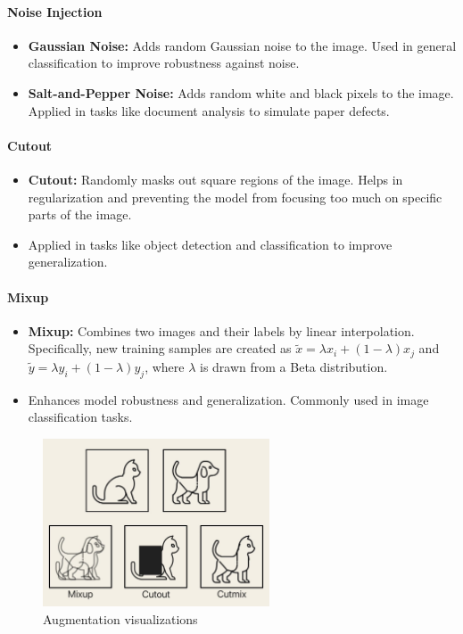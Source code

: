 \documentclass[12pt]{article}
\begin{document}
\paragraph{Noise Injection}
\begin{itemize}
    \item \textbf{Gaussian Noise:} Adds random Gaussian noise to the image. Used in general classification to improve robustness against noise.
    \item \textbf{Salt-and-Pepper Noise:} Adds random white and black pixels to the image. Applied in tasks like document analysis to simulate paper defects.
\end{itemize}

\paragraph{Cutout}
\begin{itemize}
    \item \textbf{Cutout:} Randomly masks out square regions of the image. Helps in regularization and preventing the model from focusing too much on specific parts of the image.
    \item Applied in tasks like object detection and classification to improve generalization.
\end{itemize}

\paragraph{Mixup}
\begin{itemize}
    \item \textbf{Mixup:} Combines two images and their labels by linear interpolation. Specifically, new training samples are created as \( \tilde{x} = \lambda x_i + (1 - \lambda) x_j \) and \( \tilde{y} = \lambda y_i + (1 - \lambda) y_j \), where \( \lambda \) is drawn from a Beta distribution.
    \item Enhances model robustness and generalization. Commonly used in image classification tasks.
\end{itemize}

\begin{figure}[h]
    \centering
    \includegraphics[width=0.6\textwidth]{./media/vision_aug.jpeg}
    \caption{Augmentation visualizations}
    \label{fig:aug}
\end{figure}
\end{document}
